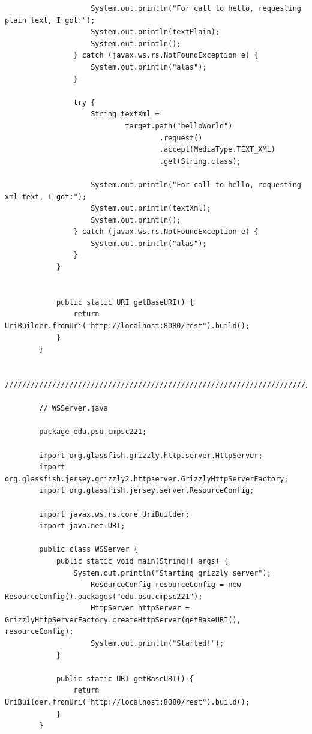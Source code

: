 \documentclass[a4paper, 11pt]{article}
\begin{document}
\begin{lstlisting}
                    System.out.println("For call to hello, requesting plain text, I got:");
                    System.out.println(textPlain);
                    System.out.println();
                } catch (javax.ws.rs.NotFoundException e) {
                    System.out.println("alas");
                }

                try {
                    String textXml =
                            target.path("helloWorld")
                                    .request()
                                    .accept(MediaType.TEXT_XML)
                                    .get(String.class);

                    System.out.println("For call to hello, requesting xml text, I got:");
                    System.out.println(textXml);
                    System.out.println();
                } catch (javax.ws.rs.NotFoundException e) {
                    System.out.println("alas");
                }
            }


            public static URI getBaseURI() {
                return UriBuilder.fromUri("http://localhost:8080/rest").build();
            }
        }

        ////////////////////////////////////////////////////////////////////////////

        // WSServer.java

        package edu.psu.cmpsc221;

        import org.glassfish.grizzly.http.server.HttpServer;
        import org.glassfish.jersey.grizzly2.httpserver.GrizzlyHttpServerFactory;
        import org.glassfish.jersey.server.ResourceConfig;

        import javax.ws.rs.core.UriBuilder;
        import java.net.URI;

        public class WSServer {
            public static void main(String[] args) {
                System.out.println("Starting grizzly server");
                    ResourceConfig resourceConfig = new ResourceConfig().packages("edu.psu.cmpsc221");
                    HttpServer httpServer = GrizzlyHttpServerFactory.createHttpServer(getBaseURI(), resourceConfig);
                    System.out.println("Started!");
            }

            public static URI getBaseURI() {
                return UriBuilder.fromUri("http://localhost:8080/rest").build();
            }
        }
        \end{lstlisting}


    \newpage
\end{document}
